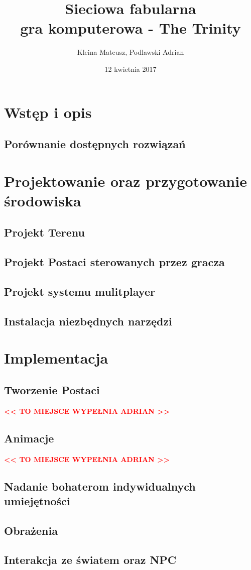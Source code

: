 \documentclass{article}
\title{Sieciowa fabularna\\gra komputerowa - The Trinity}
\author{Kleina Mateusz, Podlawski Adrian}
\date{12 kwietnia 2017}
\newcommand{\todoadrian}{\textbf{\textcolor{red}{<< TO MIEJSCE WYPEŁNIA ADRIAN >>}}}
\begin{document}
\begin{titlepage}
\maketitle
\tableofcontents
\end{titlepage}

\section{Wstęp i opis}
\subsection{Porównanie dostępnych rozwiązań}

\section{Projektowanie oraz przygotowanie środowiska}
\subsection{Projekt Terenu}
\subsection{Projekt Postaci sterowanych przez gracza}
\subsection{Projekt systemu mulitplayer}
\subsection{Instalacja niezbędnych narzędzi}

\section{Implementacja}
  
  \subsection{Tworzenie Postaci}
  \todoadrian
  
  
  \subsection{Animacje}
  \todoadrian
  
  

  \subsection{Nadanie bohaterom indywidualnych umiejętności}
  \subsection{Obrażenia}
  \subsection{Interakcja ze światem oraz NPC}
\end{document}
